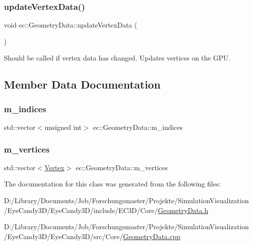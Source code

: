 \subsubsection{\texorpdfstring{update\+Vertex\+Data()}{updateVertexData()}}
{\footnotesize\ttfamily void ec\+::\+Geometry\+Data\+::update\+Vertex\+Data (\begin{DoxyParamCaption}{ }\end{DoxyParamCaption})}

Should be called if vertex data has changed. Updates vertices on the G\+PU. 

\subsection{Member Data Documentation}
\mbox{\label{classec_1_1_geometry_data_ab32858fa60eb5c6859c287d00b14357d}} 
\subsubsection{\texorpdfstring{m\+\_\+indices}{m\_indices}}
{\footnotesize\ttfamily std\+::vector$<$unsigned int$>$ ec\+::\+Geometry\+Data\+::m\+\_\+indices}

\mbox{\label{classec_1_1_geometry_data_ade3f4dd48315b696846bb2c00267394c}} 
\subsubsection{\texorpdfstring{m\+\_\+vertices}{m\_vertices}}
{\footnotesize\ttfamily std\+::vector$<$\mbox{\hyperlink{structec_1_1_vertex}{Vertex}}$>$ ec\+::\+Geometry\+Data\+::m\+\_\+vertices}



The documentation for this class was generated from the following files\+:\begin{DoxyCompactItemize}
\item 
D\+:/\+Library/\+Documents/\+Job/\+Forschungsmaster/\+Projekte/\+Simulation\+Visualization/\+Eye\+Candy3\+D/\+Eye\+Candy3\+D/include/\+E\+C3\+D/\+Core/\mbox{\hyperlink{_geometry_data_8h}{Geometry\+Data.\+h}}\item 
D\+:/\+Library/\+Documents/\+Job/\+Forschungsmaster/\+Projekte/\+Simulation\+Visualization/\+Eye\+Candy3\+D/\+Eye\+Candy3\+D/src/\+Core/\mbox{\hyperlink{_geometry_data_8cpp}{Geometry\+Data.\+cpp}}\end{DoxyCompactItemize}
